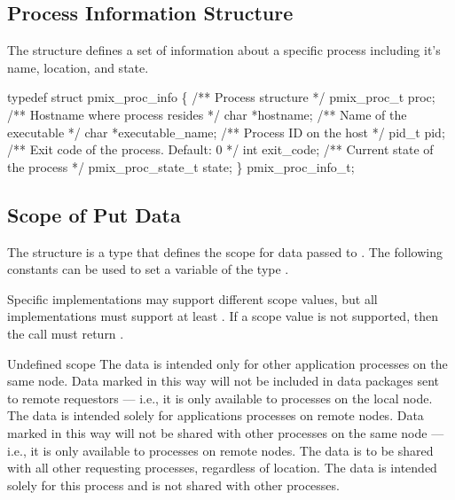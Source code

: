 \subsection{Process Information Structure}

The  structure defines a set of information about a specific process including it's name, location, and state.

\cspecificstart
\begin{codepar}
typedef struct pmix_proc_info \{
    /** Process structure */
    pmix_proc_t proc;
    /** Hostname where process resides */
    char *hostname;
    /** Name of the executable */
    char *executable_name;
    /** Process ID on the host */
    pid_t pid;
    /** Exit code of the process. Default: 0 */
    int exit_code;
    /** Current state of the process */
    pmix_proc_state_t state;
\} pmix_proc_info_t;
\end{codepar}
\cspecificend


\subsection{Scope of Put Data}

The  structure is a  type that defines the scope for data passed to .
The following constants can be used to set a variable of the type .

Specific implementations may support different scope values, but all implementations must support at least .
If a scope value is not supported, then the  call must return .

\begin{constantdesc}
%
Undefined scope
%
The data is intended only for other application processes on the same node.
Data marked in this way will not be included in data packages sent to remote requestors --- i.e., it is only available to processes on the local node.
%
The data is intended solely for applications processes on remote nodes.
Data marked in this way will not be shared with other processes on the same node --- i.e., it is only available to  processes on remote nodes.
%
The data is to be shared with all other requesting processes, regardless of location.
%
The data is intended solely for this process and is not shared with other processes.
%
\end{constantdesc}




